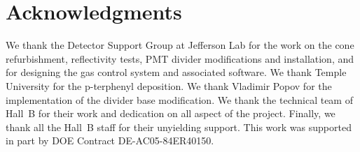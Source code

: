 \section{Acknowledgments}

We thank the Detector Support Group at Jefferson Lab for the work on the cone refurbishment, reflectivity tests,
PMT divider modifications and installation, and for designing the gas control system and associated software. We
thank Temple University for the p-terphenyl deposition. We thank Vladimir Popov for the implementation of the
divider base modification. 
We thank the technical team of Hall~B for their work and dedication on all aspect of the project. Finally, we thank
all the Hall~B staff for their unyielding support. This work was supported in part by
DOE Contract DE-AC05-84ER40150.

